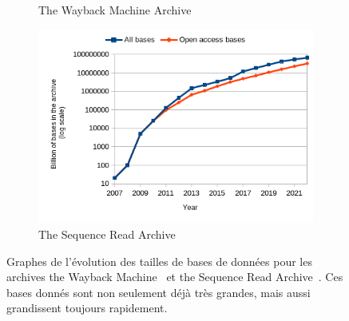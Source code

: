 \begin{figure}
    \centering
    \begin{subfigure}[b]{0.45\textwidth}
        \caption{The Wayback Machine Archive}
    \end{subfigure}
    \begin{subfigure}[b]{0.49\textwidth}
    \includegraphics[width=\textwidth]{0_sheets/sra_growth.png}
    \caption{The Sequence Read Archive}
\end{subfigure}
\caption{
    Graphes de l'évolution des tailles de bases de données pour les archives the Wayback Machine~\cite{web-archive-growth} et the Sequence Read Archive~\cite{sra}. Ces bases donnés sont non seulement déjà très grandes, mais aussi grandissent toujours rapidement.
    }
\label{fig:scalability_FR}
\end{figure}

